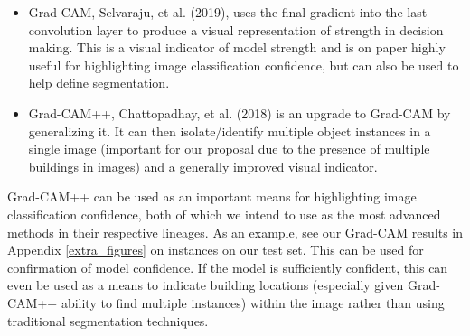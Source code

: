 \documentclass{article}
\begin{document}

\begin{itemize} %
    \item Grad-CAM, Selvaraju, et al.\cite{selvaraju} (2019), uses the final gradient into the last convolution layer to produce a visual representation of strength in decision making. This is a visual indicator of model strength and is on paper highly useful for highlighting image classification confidence, but can also be used to help define segmentation. 
    \item Grad-CAM++, Chattopadhay, et al.\cite{chattopadhay} (2018) is an upgrade to Grad-CAM by generalizing it. It can then isolate/identify multiple object instances in a single image (important for our proposal due to the presence of multiple buildings in images) and a generally improved visual indicator. 
\end{itemize}

Grad-CAM++ can be used as an important means for highlighting image classification confidence, both of which we intend to use as the most advanced methods in their respective lineages. As an example, see our Grad-CAM results in Appendix \ref{extra_figures} on instances on our test set. This can be used for confirmation of model confidence. If the model is sufficiently confident, this can even be used as a means to indicate building locations (especially given Grad-CAM++ ability to find multiple instances) within the image rather than using traditional segmentation techniques.
\end{document}
